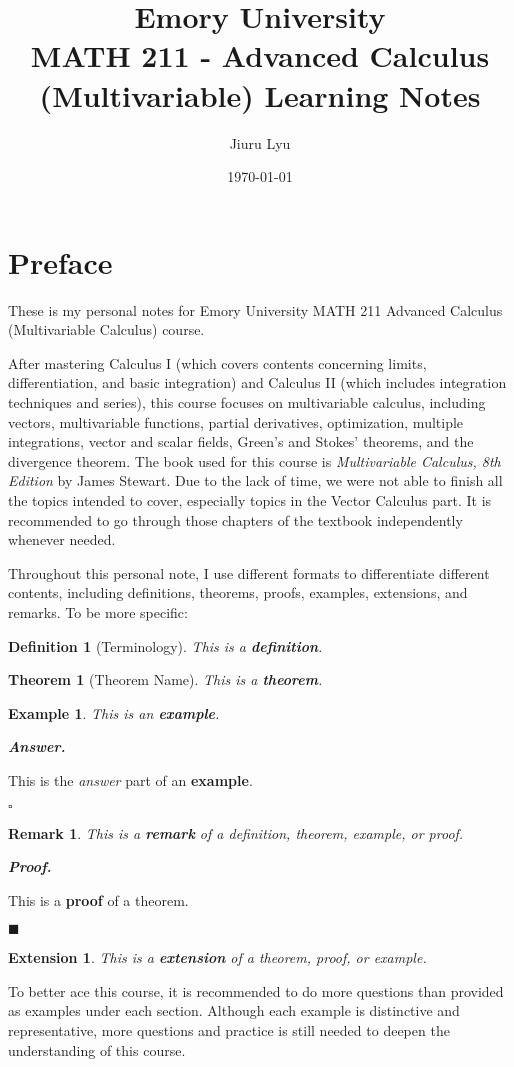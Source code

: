 \documentclass[12pt,a4paper]{article}
\title{Emory University\\\textbf{MATH 211 - Advanced Calculus (Multivariable) Learning Notes}}
\author{Jiuru Lyu}
\date{\today}
\newtheorem{thm}{Theorem}[subsection]
\newtheorem{df}{Definition}[subsection]
\newtheorem{eg}{Example}[subsection]
\newenvironment*{ans}{\par\indent\textbf{\textit{Answer. }}\par}{\par\hfill{$\square$}\par}
\newtheorem*{rmk}{\indent Remark}
\newenvironment*{prf}{\par\indent\textbf{\textit{Proof. }}\par}{\par\hfill$\blacksquare$\par}
\newtheorem*{ext}{\indent Extension}
\begin{document}
\maketitle
\tableofcontents
\newpage

\section*{Preface}
These is my personal notes for Emory University MATH 211 Advanced Calculus (Multivariable Calculus) course. 

After mastering Calculus I (which covers contents concerning limits, differentiation, and basic integration) and Calculus II (which includes integration techniques and series), this course focuses on multivariable calculus, including vectors, multivariable functions, partial derivatives, optimization, multiple integrations, vector and scalar fields, Green’s and Stokes’ theorems, and the divergence theorem. The book used for this course is \textit{Multivariable Calculus, 8th Edition} by James Stewart. Due to the lack of time, we were not able to finish all the topics intended to cover, especially topics in the Vector Calculus part. It is recommended to go through those chapters of the textbook independently whenever needed. 

Throughout this personal note, I use different formats to differentiate different contents, including definitions, theorems, proofs, examples, extensions, and remarks. To be more specific: 
\begin{df}[Terminology]
    This is a \textbf{definition}.	
\end{df}
\begin{thm}[Theorem Name]
    This is a \textbf{theorem}.	
\end{thm}
\begin{eg}
    This is  an \textbf{example}. 
\end{eg}

\begin{ans}
    This is the \textit{answer} part of an \textbf{example}. 
\end{ans}
\begin{rmk}
	This is a \textbf{remark} of a definition, theorem, example, or proof. 
\end{rmk}

\begin{prf}
	This is a \textbf{proof} of a theorem. 
\end{prf}
\begin{ext}
	This is a \textbf{extension} of a theorem, proof, or example. 	
\end{ext}
To better ace this course, it is recommended to do more questions than provided as examples under each section. Although each example is distinctive and representative, more questions and practice is still needed to deepen the understanding of this course. 
\end{document}
